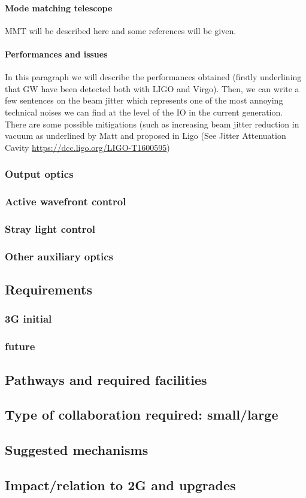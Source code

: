 \paragraph{Mode matching telescope}
MMT will be described here and some references will be given.

\paragraph {Performances and issues}
 In this paragraph we will describe the performances obtained (firstly underlining that GW have been detected both with LIGO and Virgo). Then, we can write a few sentences on the beam jitter which represents one of the most annoying technical noises we can find at the level of the IO in the current generation. There are some possible mitigations (such as increasing beam jitter reduction in vacuum as underlined by Matt and proposed in Ligo (See Jitter Attenuation Cavity \url{https://dcc.ligo.org/LIGO-T1600595})



\subsubsection{Output optics}
\subsubsection{Active wavefront control}
\subsubsection{Stray light control}
\subsubsection{Other auxiliary optics}

\subsection{Requirements}
\subsubsection{3G initial}
\subsubsection{future}
\subsection{Pathways and required facilities}
\subsection{Type of collaboration required:  small/large}
\subsection{Suggested mechanisms}
\subsection{Impact/relation to 2G and upgrades}